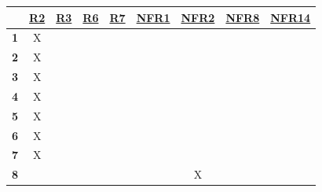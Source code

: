 \documentclass[12pt, titlepage]{article}
\begin{document}
\noindent
\begin{table} [H]
  \centering
  \begin{tabular}{|c|c|c|c|c|c|c|c|c|}
    \hline
                 & \href{https://github.com/zakerl/Capstone_Project/blob/main/docs/SRS/SRS.pdf}{R2} & \href{https://github.com/zakerl/Capstone_Project/blob/main/docs/SRS/SRS.pdf}{R3} & \href{https://github.com/zakerl/Capstone_Project/blob/main/docs/SRS/SRS.pdf}{R6} & \href{https://github.com/zakerl/Capstone_Project/blob/main/docs/SRS/SRS.pdf}{R7} & \href{https://github.com/zakerl/Capstone_Project/blob/main/docs/SRS/SRS.pdf}{NFR1} & \href{https://github.com/zakerl/Capstone_Project/blob/main/docs/SRS/SRS.pdf}{NFR2} & \href{https://github.com/zakerl/Capstone_Project/blob/main/docs/SRS/SRS.pdf}{NFR8} & \href{https://github.com/zakerl/Capstone_Project/blob/main/docs/SRS/SRS.pdf}{NFR14} \\
    \hline
    \textbf{1}  &X                    &                     &                     &                     &                       &                       &                       & \\ \hline
    \textbf{2}  &X                     &                     &                     &                     &                       &                       &                       &  \\ \hline
    \textbf{3}  &X                     &                     &                     &                     &                       &                       &                       &  \\ \hline
    \textbf{4}  & X                    &                   &                     &                     &                       &                       &                       & \\ \hline
    \textbf{5}  & X                    &                   &                     &                     &                       &                       &                       & \\ \hline
    \textbf{6}  & X                    &                   &                     &                     &                       &                       &                       & \\ \hline
    \textbf{7}  &  X                   &                     &                     &                     &                     &                    &                       &   \\ \hline
    \textbf{8}  &                     &                     &                     &                     &                       &X                       &                      &   \\ \hline

\end{tabular}
\end{table}
\end{document}
